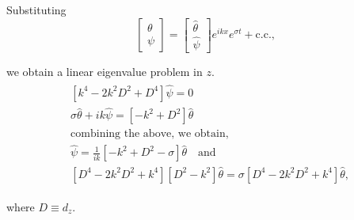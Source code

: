 \documentclass{article}
\begin{document}
Substituting
\begin{equation}
 \begin{bmatrix}
    \theta \\
     \psi
 \end{bmatrix} = \begin{bmatrix}
    \hat{\theta} \\
     \hat{\psi}
 \end{bmatrix}e^{ikx}e^{\sigma t} + \textrm{c.c.}, 
\end{equation}

we obtain a linear eigenvalue problem in $z$.
\begin{align}
 \begin{split}
  & [k^{4} - 2k^{2}D^{2} + D^{4}] \hat{\psi} = 0\\
  & \sigma \hat{\theta} + ik \hat{\psi} = [-k^{2}+D^{2}]\hat{\theta}\\
  & \textrm{combining the above, we obtain},\\
  &\boxed{ \hat{\psi} = \frac{1}{ik} [-k^{2}+D^{2} - \sigma]\hat{\theta} }\quad \textrm{and}\\
  & \boxed{ [D^{4} - 2k^{2}D^{2} + k^{4}][D^{2}-k^{2}]\hat{\theta} = \sigma [D^{4} - 2k^{2}D^{2} + k^{4}] \hat{\theta} },
 \end{split}
\end{align}

where $D \equiv d_{z}$. 

\end{document}
